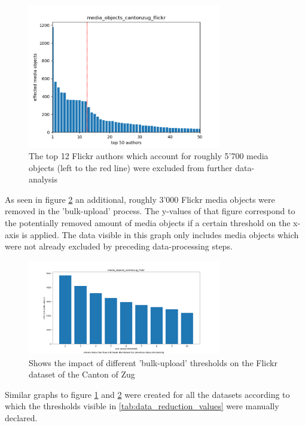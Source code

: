 \begin{figure}[h!]
   \centering
   \includegraphics[width=0.75\textwidth]{img/cantonzug_flickr_top50_w_line}
   \caption{The top 12 Flickr authors which account for roughly 5'700 media objects (left to the red line) were excluded from further data-analysis}
   \label{img:dominant_users_flickr}
\end{figure}

As seen in figure \ref{img:bulk_uploads_flickr} an additional, roughly 3'000 Flickr media objects were removed in the 'bulk-upload' process. The y-values of that figure correspond to the potentially removed amount of media objects if a certain threshold on the x-axis is applied. The data visible in this graph only includes media objects which were not already excluded by preceding data-processing steps.

\begin{figure}[h!]
   \centering
   \includegraphics[width=0.75\textwidth]{img/cantonzug_flickr_bulkuploads_cropped.pdf}
   \caption{Shows the impact of different 'bulk-upload' thresholds on the Flickr dataset of the Canton of Zug}
   \label{img:bulk_uploads_flickr}
\end{figure}

Similar graphs to figure \ref{img:dominant_users_flickr} and \ref{img:bulk_uploads_flickr} were created for all the datasets according to which the thresholds visible in \ref{tab:data_reduction_values} were manually declared. 

